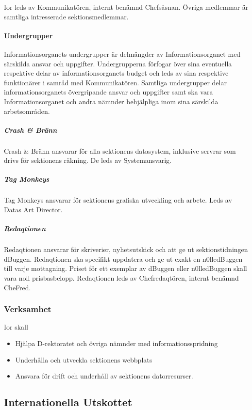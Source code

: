 \documentclass{dgovdoc}
\begin{document}
Ior leds av Kommunikatören, internt benämnd Chefsåsnan. Övriga medlemmar
är samtliga intresserade sektionsmedlemmar.

\paragraph{Undergrupper}

Informationsorganets undergrupper är delmängder av Informationsorganet
med särskilda ansvar och uppgifter. Undergrupperna förfogar
över sina eventuella respektive delar av informationsorganets budget
och leds av sina respektive funktionärer i samråd med Kommunikatören.
Samtliga undergrupper delar informationsorganets
övergripande ansvar och uppgifter samt ska vara Informationsorganet
och andra nämnder behjälpliga inom sina särskilda arbetsområden.

\subparagraph{Crash & Bränn}

Crash & Bränn ansvarar för alla sektionens datasystem, inklusive servrar som drivs för sektionens räkning. De leds av Systemansvarig.

\subparagraph{Tag Monkeys}

Tag Monkeys ansvarar för sektionens grafiska utveckling och
arbete. Leds av Datas Art Director.

\subparagraph{Redaqtionen}

Redaqtionen ansvarar för skriverier, nyhetsutskick och att ge
ut sektionstidningen dBuggen. Redaqtionen ska specifikt uppdatera
och ge ut exakt en n0lledBuggen till varje mottagning.
Priset för ett exemplar av dBuggen eller n0lledBuggen skall
vara noll prisbasbelopp. Redaqtionen leds av Chefredaqtören,
internt benämnd CheFred.

\subsubsection{Verksamhet}

Ior skall

\begin{itemize}
  \item Hjälpa D-rektoratet och övriga nämnder med informationsspridning
  \item Underhålla och utveckla sektionens webbplats
  \item Ansvara för drift och underhåll av sektionens datorresurser.
\end{itemize}

\subsection{Internationella Utskottet}
\end{document}
